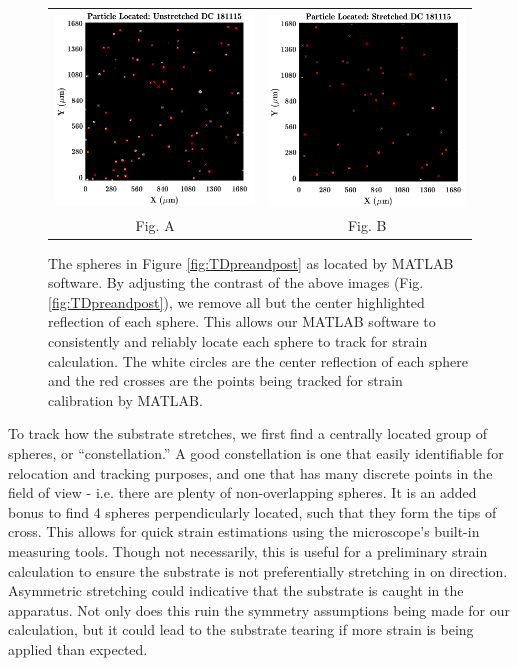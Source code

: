\begin{figure}[h!]
	\begin{tabular}{cc}
		\includegraphics[width= .5\linewidth]{Chapters/Figures/particle_located_unstretched.pdf} & \includegraphics[width= .5\linewidth]{Chapters/Figures/particle_located_stretched.pdf}\\
		Fig. A & Fig. B
	\end{tabular}
	\caption[Particle-Locating for Stretch Calibration]{The spheres in Figure \ref{fig:TDpreandpost} as located by MATLAB software. By adjusting the contrast of the above images (Fig. \ref{fig:TDpreandpost}), we remove all but the center highlighted reflection of each sphere. This allows our MATLAB software to consistently and reliably locate each sphere to track for strain calculation. The white circles are the center reflection of each sphere and the red crosses are the points being tracked for strain calibration by MATLAB.}
	\label{fig:particleTracking}
\end{figure}


To track how the substrate stretches, we first find a centrally located group of spheres, or ``constellation.'' A good constellation is one that easily identifiable for relocation and tracking purposes, and one that has many discrete points in the field of view - i.e. there are plenty of non-overlapping spheres. It is an added bonus to find 4 spheres perpendicularly located, such that they form the tips of cross. This allows for quick strain estimations using the microscope's built-in measuring tools. Though not necessarily, this is useful for a preliminary strain calculation to ensure the substrate is not preferentially stretching in on direction. Asymmetric stretching could indicative that the substrate is caught in the apparatus. Not only does this ruin the symmetry assumptions being made for our calculation, but it could lead to the substrate tearing if more strain is being applied than expected. 

